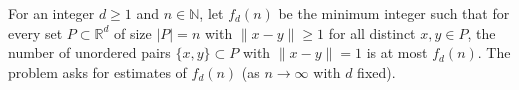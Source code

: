 For an integer \(d\ge 1\) and \(n\in\mathbb{N}\), let \(f_d(n)\) be the minimum integer such that for every set
\(P\subset\mathbb{R}^d\) of size \(|P|=n\) with \(\|x-y\|\ge 1\) for all distinct \(x,y\in P\), the number of unordered pairs \(\{x,y\}\subset P\) with \(\|x-y\|=1\) is at most \(f_d(n)\).
The problem asks for estimates of \(f_d(n)\) (as \(n\to\infty\) with \(d\) fixed).
